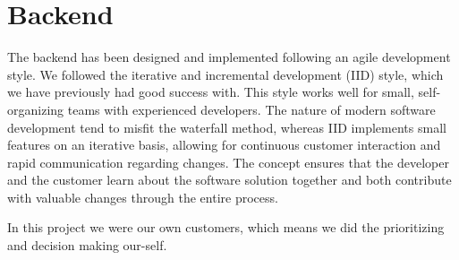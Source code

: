 \chapter{Backend}
\label{chap:backend}

The backend has been designed and implemented following an agile development style. We followed the iterative and incremental development (IID) style, which we have previously had good success with. This style works well for small, self-organizing teams with experienced developers. The nature of modern software development tend to misfit the waterfall method, whereas IID implements small features on an iterative basis, allowing for continuous customer interaction and rapid communication regarding changes. The concept ensures that the developer and the customer learn about the software solution together and both contribute with valuable changes through the entire process. 

In this project we were our own customers, which means we did the prioritizing and decision making our-self.




